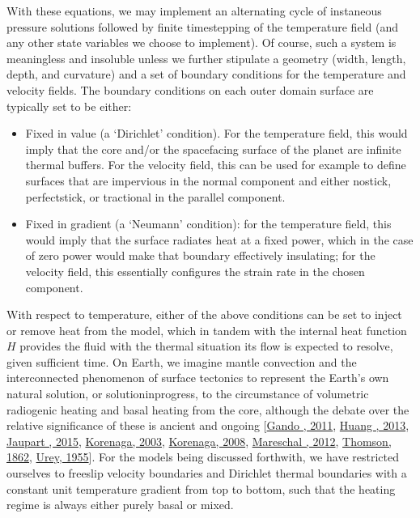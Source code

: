 \documentclass[letterpaper,10pt,english]{jupyterBook}
\begin{document}
\sphinxAtStartPar
With these equations, we may implement an alternating cycle of instaneous pressure solutions followed by finite time\sphinxhyphen{}stepping of the temperature field (and any other state variables we choose to implement). Of course, such a system is meaningless and insoluble unless we further stipulate a geometry (width, length, depth, and curvature) and a set of boundary conditions for the temperature and velocity fields. The boundary conditions on each outer domain surface are typically set to be either:
\begin{itemize}
\item {} 
\sphinxAtStartPar
Fixed in value (a ‘Dirichlet’ condition). For the temperature field, this would imply that the core and/or the space\sphinxhyphen{}facing surface of the planet are infinite thermal buffers. For the velocity field, this can be used \sphinxhyphen{} for example \sphinxhyphen{} to define surfaces that are impervious in the normal component and either no\sphinxhyphen{}stick, perfect\sphinxhyphen{}stick, or tractional in the parallel component.

\item {} 
\sphinxAtStartPar
Fixed in gradient (a ‘Neumann’ condition): for the temperature field, this would imply that the surface radiates heat at a fixed power, which in the case of zero power would make that boundary effectively insulating; for the velocity field, this essentially configures the strain rate in the chosen component.

\end{itemize}

\sphinxAtStartPar
With respect to temperature, either of the above conditions can be set to inject or remove heat from the model, which \sphinxhyphen{} in tandem with the internal heat function \(H\) \sphinxhyphen{} provides the fluid with the thermal situation its flow is expected to resolve, given sufficient time. On Earth, we imagine mantle convection and the interconnected phenomenon of surface tectonics to represent the Earth’s own natural solution, or solution\sphinxhyphen{}in\sphinxhyphen{}progress, to the circumstance of volumetric radiogenic heating and basal heating from the core, although the debate over the relative significance of these is ancient and ongoing {[}\hyperlink{cite.references:id522}{Gando , 2011}, \hyperlink{cite.references:id377}{Huang , 2013}, \hyperlink{cite.references:id392}{Jaupart , 2015}, \hyperlink{cite.references:id306}{Korenaga, 2003}, \hyperlink{cite.references:id472}{Korenaga, 2008}, \hyperlink{cite.references:id365}{Mareschal , 2012}, \hyperlink{cite.references:id650}{Thomson, 1862}, \hyperlink{cite.references:id367}{Urey, 1955}{]}. For the models being discussed forthwith, we have restricted ourselves to free\sphinxhyphen{}slip velocity boundaries and Dirichlet thermal boundaries with a constant unit temperature gradient from top to bottom, such that the heating regime is always either purely basal or mixed.
\end{document}
